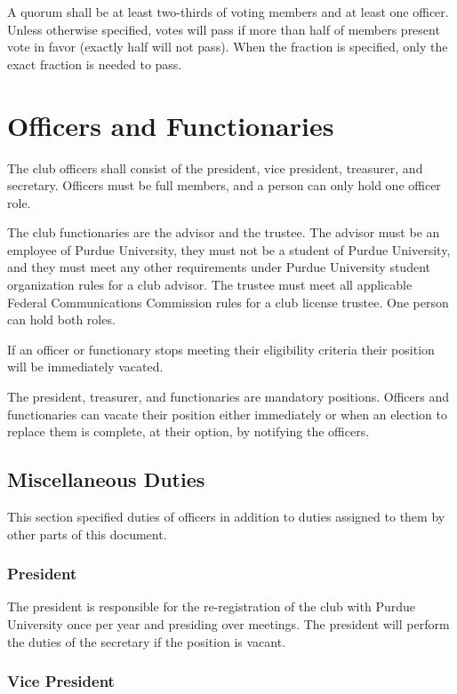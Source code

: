\documentclass{article}
\begin{document}
A quorum shall be at least two-thirds of voting members and at least one
officer. Unless otherwise specified, votes will pass if more than half of
members present vote in favor (exactly half will not pass). When the fraction is
specified, only the exact fraction is needed to pass.

\section{Officers and Functionaries}

The club officers shall consist of the president, vice president, treasurer, and
secretary. Officers must be full members, and a person can only hold one officer
role.

The club functionaries are the advisor and the trustee. The advisor must be an
employee of Purdue University, they must not be a student of Purdue University,
and they must meet any other requirements under Purdue University student
organization rules for a club advisor. The trustee must meet all applicable
Federal Communications Commission rules for a club license trustee. One person
can hold both roles.

If an officer or functionary stops meeting their eligibility criteria their
position will be immediately vacated.

The president, treasurer, and functionaries are mandatory positions. Officers
and functionaries can vacate their position either immediately or when an
election to replace them is complete, at their option, by notifying the
officers.

\subsection{Miscellaneous Duties}

This section specified duties of officers in addition to duties assigned to them
by other parts of this document.

\subsubsection{President}

The president is responsible for the re-registration of the club with Purdue
University once per year and presiding over meetings. The president will perform
the duties of the secretary if the position is vacant.

\subsubsection{Vice President}
\end{document}
